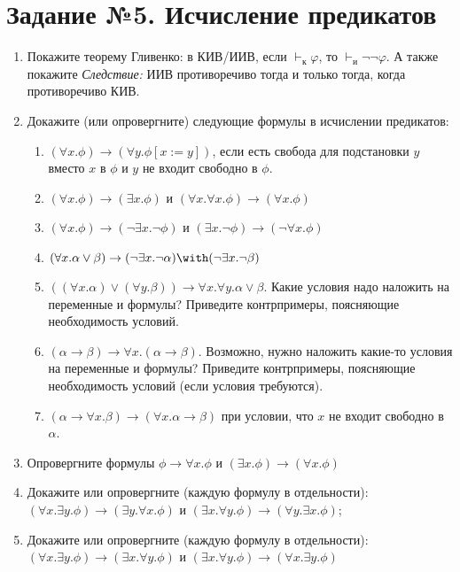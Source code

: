 \documentclass[10pt,a4paper,oneside]{article}
\begin{document}
\section*{Задание №5. Исчисление предикатов}

\begin{enumerate}
\item Покажите теорему Гливенко: в КИВ/ИИВ, если $\vdash_\text{к} \varphi$, то $\vdash_\text{и} \neg\neg\varphi$. А также покажите
\emph{Следствие:} ИИВ противоречиво тогда и только тогда, когда противоречиво КИВ.
\item Докажите (или опровергните) следующие формулы в исчислении предикатов:
\begin{enumerate}
\item $(\forall x.\phi)\rightarrow (\forall y.\phi[x := y])$, если есть свобода для подстановки $y$ вместо $x$ в $\phi$ и $y$ не входит свободно в $\phi$.
\item $(\forall x.\phi)\rightarrow (\exists x.\phi)$ и $(\forall x.\forall x.\phi) \rightarrow (\forall x.\phi)$
\item $(\forall x.\phi) \rightarrow (\neg \exists x.\neg \phi)$ и $(\exists x.\neg\phi) \rightarrow (\neg \forall x.\phi)$
\item $(\forall x.\alpha\vee\beta) \rightarrow (\neg \exists x.\neg \alpha) \with (\neg \exists x.\neg\beta)$
\item $((\forall x.\alpha) \vee (\forall y.\beta)) \rightarrow \forall x.\forall y.\alpha\vee\beta$. Какие условия
надо наложить на переменные и формулы? Приведите контрпримеры, поясняющие необходимость условий.
\item $(\alpha\rightarrow\beta) \rightarrow \forall x.(\alpha\rightarrow\beta)$. Возможно, нужно наложить
какие-то условия на переменные и формулы? Приведите контрпримеры, поясняющие необходимость условий (если 
условия требуются).
\item $(\alpha \rightarrow \forall x.\beta) \rightarrow (\forall x.\alpha\rightarrow\beta)$ при условии, что $x$ не входит свободно в $\alpha$.
\end{enumerate}

\item Опровергните формулы $\phi\rightarrow\forall x.\phi$ и $(\exists x.\phi)\rightarrow (\forall x.\phi)$

\item Докажите или опровергните (каждую формулу в отдельности): $(\forall x.\exists y.\phi) \rightarrow (\exists y.\forall x.\phi)$ и
$(\exists x.\forall y.\phi) \rightarrow (\forall y.\exists x.\phi)$;
\item Докажите или опровергните (каждую формулу в отдельности): $(\forall x.\exists y.\phi) \rightarrow (\exists x.\forall y.\phi)$ и
$(\exists x.\forall y.\phi) \rightarrow (\forall x.\exists y.\phi)$


\end{enumerate}
\end{document}
